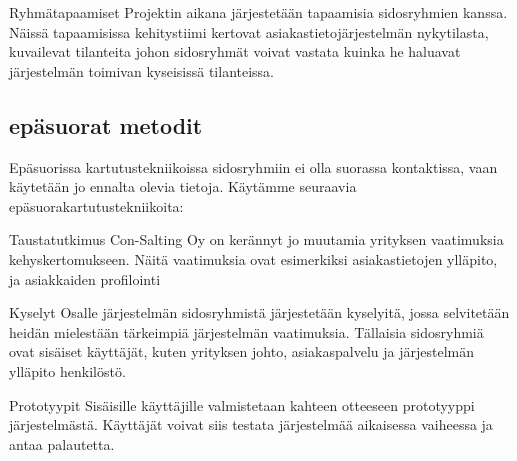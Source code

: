 Ryhmätapaamiset 
Projektin aikana järjestetään tapaamisia sidosryhmien kanssa. Näissä tapaamisissa kehitystiimi kertovat asiakastietojärjestelmän nykytilasta, kuvailevat tilanteita 
johon sidosryhmät voivat vastata kuinka he haluavat järjestelmän toimivan kyseisissä tilanteissa.


 \subsection{epäsuorat metodit}
Epäsuorissa kartutustekniikoissa sidosryhmiin ei olla suorassa kontaktissa, vaan käytetään jo ennalta olevia tietoja.
Käytämme seuraavia epäsuorakartutustekniikoita:

Taustatutkimus 
Con-Salting Oy on kerännyt jo muutamia yrityksen vaatimuksia kehyskertomukseen.
Näitä vaatimuksia ovat esimerkiksi asiakastietojen ylläpito, ja asiakkaiden profilointi

Kyselyt
Osalle järjestelmän sidosryhmistä järjestetään kyselyitä, jossa selvitetään heidän mielestään tärkeimpiä järjestelmän vaatimuksia.
Tällaisia sidosryhmiä ovat sisäiset käyttäjät, kuten yrityksen johto, asiakaspalvelu ja järjestelmän ylläpito henkilöstö.

Prototyypit
Sisäisille käyttäjille valmistetaan kahteen otteeseen prototyyppi järjestelmästä. Käyttäjät voivat siis testata järjestelmää aikaisessa vaiheessa ja antaa palautetta.